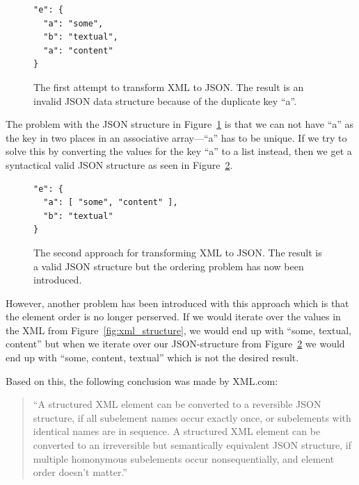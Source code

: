 \documentclass{cslthse-msc}
\begin{document}
\begin{figure}[H]
  \centering
    \begin{center}
\begin{lstlisting}[breaklines=true,frame=single]
"e": {
  "a": "some",
  "b": "textual",
  "a": "content"
}
\end{lstlisting}
    \end{center}
  \caption{The first attempt to transform XML to JSON. The result is an invalid JSON data structure because of the duplicate key \enquote{a}.}
  \label{fig:xml_wrong}
\end{figure}

The problem with the JSON structure in Figure~\ref{fig:xml_wrong} is that we can not have \enquote{a} as the key in two places in an associative array---\enquote{a} has to be unique. If we try to solve this by converting the values for the key \enquote{a} to a list instead, then we get a syntactical valid JSON structure as seen in Figure~\ref{fig:json_wrong}.

\begin{figure}[H]
  \centering
    \begin{center}
\begin{lstlisting}[breaklines=true,frame=single]
"e": {
  "a": [ "some", "content" ],
  "b": "textual"
}
\end{lstlisting}
    \end{center}
  \caption{The second approach for transforming XML to JSON. The result is a valid JSON structure but the ordering problem has now been introduced.}
  \label{fig:json_wrong}
\end{figure}

However, another problem has been introduced with this approach which is that the element order is no longer perserved. If we would iterate over the values in the XML from Figure~\ref{fig:xml_structure}, we would end up with \enquote{some, textual, content} but when we iterate over our JSON-structure from Figure~\ref{fig:json_wrong} we would end up with \enquote{some, content, textual} which is not the desired result.

\vspace{5mm}
\noindent Based on this, the following conclusion was made by XML.com:

\begin{quote}

\enquote{A structured XML element can be converted to a reversible JSON structure, if all subelement names occur exactly once, or subelements with identical names are in sequence. A structured XML element can be converted to an irreversible but semantically equivalent JSON structure, if multiple homonymous subelements occur nonsequentially, and element order doesn't matter.} \cite{xml_json}

\end{quote}
\end{document}
